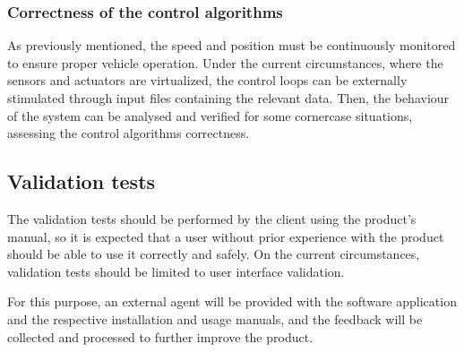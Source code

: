 \subsubsection{Correctness of the control algorithms}%
\label{sec:correct-control-algorithms-test}
As previously mentioned, the speed and position must be continuously monitored
to ensure proper vehicle operation. Under the current circumstances, where the
sensors and actuators are virtualized, the control loops can be externally
stimulated through input files containing the relevant data. Then, the behaviour
of the system can be analysed and verified for some cornercase situations,
assessing the control algorithms correctness.
%
%
%

\subsection{Validation tests}%
\label{sec:orgff1a37d}
The validation tests should be performed by the client using the product’s
manual, so it is expected that a user without prior experience with the product
should be able to use it correctly and safely. On the current circumstances,
validation tests should be limited to user interface validation.

For this purpose, an external agent will be provided with the software
application and the respective installation and usage manuals, and the feedback
will be collected and processed to further improve the product.
